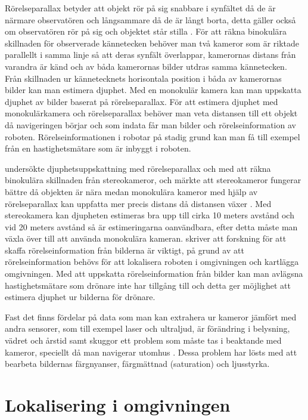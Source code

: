 Rörelseparallax betyder att objekt rör på sig snabbare i synfältet då de är närmare observatören och långsammare då de är långt borta, detta gäller också om observatören rör på sig och objektet står stilla \citep{suomimainittu, parallax}. För att räkna binokulära skillnaden för observerade kännetecken behöver man två kameror som är riktade parallellt i samma linje så att deras synfält överlappar, kamerornas distans från varandra är känd och av båda kamerornas bilder utdras samma kännetecken. Från skillnaden ur kännetecknets horisontala position i båda av kamerornas bilder kan man estimera djuphet. Med en monokulär kamera kan man uppskatta djuphet av bilder baserat på rörelseparallax. För att estimera djuphet med monokulärkamera och rörelseparallax behöver man veta distansen till ett objekt då navigeringen börjar och som indata får man bilder och rörelseinformation av roboten. Rörelseinformationen i robotar på stadig grund kan man få till exempel från en hastighetsmätare som är inbyggt i roboten.

\cite{suomimainittu} undersökte djuphetsuppskattning med rörelseparallax och med att räkna binokulära skillnaden från stereokameror, och märkte att stereokameror fungerar bättre då objekten är nära medan monokulära kameror med hjälp av rörelseparallax kan uppfatta mer precis distans då distansen växer \citep{suomimainittu}. Med stereokamera kan djupheten estimeras bra upp till cirka 10 meters avstånd och vid 20 meters avstånd så är estimeringarna oanvändbara, efter detta måste man växla över till att använda monokulära kameran. \cite{suomimainittu} skriver att forskning för att skaffa rörelseinformation från bilderna är viktigt, på grund av att rörelseinformation behövs för att lokalisera roboten i omgivningen och kartlägga omgivningen. Med att uppskatta rörelseinformation från bilder kan man avlägsna hastighetsmätare som drönare inte har tillgång till och detta ger möjlighet att estimera djuphet ur bilderna för drönare.

Fast det finns fördelar på data som man kan extrahera ur kameror jämfört med andra sensorer, som till exempel laser och ultraljud, är förändring i belysning, vädret och årstid samt skuggor ett problem som måste tas i beaktande med kameror, speciellt då man navigerar utomhus \citep{982903}. Dessa problem har lösts med att bearbeta bildernas färgnyanser, färgmättnad (saturation) och ljusstyrka.

\section{Lokalisering i omgivningen}

